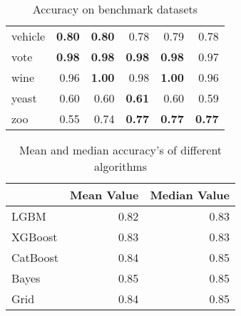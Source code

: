 \documentclass[a4paper,twoside,12pt]{book}
\begin{document}
\begin{table}[!htb]
\begin{tabular}{lrrrrr}
vehicle                 &  \textbf{0.80} &     \textbf{0.80} &      0.78 &   0.79 &  0.78 \\
vote                    &  \textbf{0.98} &     \textbf{0.98} &      \textbf{0.98} &   \textbf{0.98} &  0.97 \\
wine                    &  0.96 &     \textbf{1.00} &      0.98 &   \textbf{1.00} &  0.96 \\
yeast                   &  0.60 &     0.60 &      \textbf{0.61} &   0.60 &  0.59 \\
zoo                     &  0.55 &     0.74 &      \textbf{0.77} &   \textbf{0.77} &  \textbf{0.77} \\
\bottomrule
\end{tabular}
\caption{Accuracy on benchmark datasets}
\label{tab:benchmarki}
\end{table}


\begin{table}[!htb]
\centering
\begin{tabular}{lrr}
\toprule
{} &  Mean Value &  Median Value \\
\midrule
LGBM     &        0.82 &          0.83 \\
XGBoost  &        0.83 &          0.83 \\
CatBoost &        0.84 &          0.85 \\
Bayes    &        0.85 &          0.85 \\
Grid     &        0.84 &          0.85 \\
\bottomrule
\end{tabular}

\caption{Mean and median accuracy's of different algorithms}
\label{tab:mean_median_scores}
\end{table}
\end{document}
